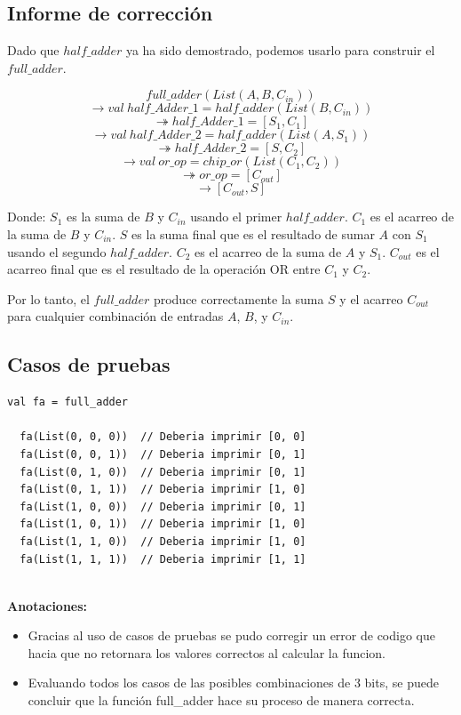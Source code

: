 \documentclass[12pt, a4paper]{article}
\begin{document}
\subsection{Informe de corrección}

Dado que \(half\_adder\) ya ha sido demostrado, podemos usarlo para construir el \(full\_adder\). 

\[ full\_adder(List(A, B, C_{in})) \]
\[ \rightarrow val~half\_Adder\_1 = half\_adder(List(B, C_{in})) \]
\[ \twoheadrightarrow half\_Adder\_1 = [S_1, C_1] \]
\[ \rightarrow val~half\_Adder\_2 = half\_adder(List(A, S_1)) \]
\[ \twoheadrightarrow half\_Adder\_2 = [S, C_2] \]
\[ \rightarrow val~or\_op = chip\_or(List(C_1, C_2)) \]
\[ \twoheadrightarrow or\_op = [C_{out}] \]
\[ \rightarrow [C_{out}, S] \]

Donde:
$ S_1$ es la suma de \(B\) y \(C_{in}\) usando el primer \(half\_adder\).
$C_1$ es el acarreo de la suma de \(B\) y \(C_{in}\).
$ S$ es la suma final que es el resultado de sumar \(A\) con \(S_1\) usando el segundo \(half\_adder\).
$ C_2 $ es el acarreo de la suma de \(A\) y \(S_1\).
$ C_{out} $ es el acarreo final que es el resultado de la operación OR entre \(C_1\) y \(C_2\).

Por lo tanto, el \(full\_adder\) produce correctamente la suma \(S\) y el acarreo \(C_{out}\) para cualquier combinación de entradas \(A\), \(B\), y \(C_{in}\).

\subsection{Casos de pruebas}
\begin{lstlisting}[style=scalaStyle, caption=Casos de prueba para la función full\_adder.]
  val fa = full_adder

  fa(List(0, 0, 0))  // Deberia imprimir [0, 0]
  fa(List(0, 0, 1))  // Deberia imprimir [0, 1]
  fa(List(0, 1, 0))  // Deberia imprimir [0, 1]
  fa(List(0, 1, 1))  // Deberia imprimir [1, 0]
  fa(List(1, 0, 0))  // Deberia imprimir [0, 1]
  fa(List(1, 0, 1))  // Deberia imprimir [1, 0]
  fa(List(1, 1, 0))  // Deberia imprimir [1, 0]
  fa(List(1, 1, 1))  // Deberia imprimir [1, 1]
  
\end{lstlisting}
\textbf{Anotaciones:}
\begin{itemize}
  \item Gracias al uso de casos de pruebas se pudo corregir un error de codigo que hacia que no retornara los valores correctos al calcular la funcion.
  \item Evaluando todos los casos de las posibles combinaciones de 3 bits, se puede concluir que la función full\_adder hace su proceso de manera correcta.
\end{itemize}
\end{document}
